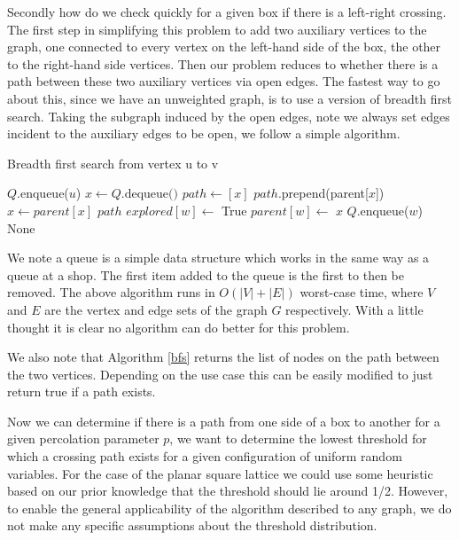 \documentclass[a4paper,11pt]{article}
\theoremstyle{definition}
\begin{document}
Secondly how do we check quickly for a given box if there is a left-right crossing. The first step in simplifying this problem to add two auxiliary vertices to the graph, one connected to every vertex on the left-hand side of the box, the other to the right-hand side vertices. Then our problem reduces to whether there is a path between these two auxiliary vertices via open edges.
The fastest way to go about this, since we have an unweighted graph, is to use a version of breadth first search. Taking the subgraph induced by the open edges, note we always set edges incident to the auxiliary edges to be open, we follow a simple algorithm.
\begin{algorithm}
	\caption{Breadth first search from vertex u to v}\label{bfs}
	\begin{algorithmic}[1]
	\State $Q$.enqueue($u$)
		\State $x \gets Q\text{.dequeue()}$
		 
			\State $path \gets [x]$
				\State $path$.prepend(parent[$x$])
				\State $x \gets parent[x]$
			\EndWhile
			\State
			\Return $path$
		\EndIf
				\State $explored[w] \gets$ True
				\State $parent[w] \gets$ $x$
				\State $Q$.enqueue($w$)
			\EndIf
		\EndFor
	\EndWhile
	 \Return None
	\EndIf
	\EndProcedure
	\end{algorithmic}
	\end{algorithm}

We note a queue is a simple data structure which works in the same way as a queue at a shop. The first item added to the queue is the first to then be removed.
The above algorithm runs in $O(|V|+|E|)$ worst-case time, where $V$ and $E$ are the vertex and edge sets of the graph $G$ respectively. With a little thought it is clear no algorithm can do better for this problem. 

We also note that Algorithm \ref*{bfs} returns the list of nodes on the path between the two vertices. Depending on the use case this can be easily modified to just return true if a path exists. 

Now we can determine if there is a path from one side of a box to another for a given percolation parameter $p$, we want to determine the lowest threshold for which a crossing path exists for a given configuration of uniform random variables. For the case of the planar square lattice we could use some heuristic based on our prior knowledge that the threshold should lie around 1/2. However, to enable the general applicability of the algorithm described to any graph, we do not make any specific assumptions about the threshold distribution.
\end{document}
